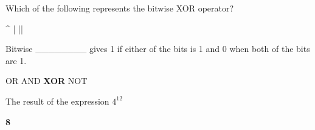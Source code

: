 \documentclass{exam}
\begin{document}
\begin{questions}
     \question Which of the following represents the bitwise XOR operator?

     \begin{oneparchoices}
         \choice \textbf{\^}
         \choice |
         \choice ||
     \end{oneparchoices}

     \question Bitwise \_\_\_\_\_\_\_\_ gives 1 if either of the bits is 1 and 0 when both of the bits are 1.

     \begin{oneparchoices}
         \choice OR
         \choice AND
         \choice \textbf{XOR}
         \choice NOT
     \end{oneparchoices}

     \question The result of the expression $4 ^ 12$

     \begin{oneparchoices}
         \choice \textbf{8}
     \end{oneparchoices}


\end{questions}
\end{document}
